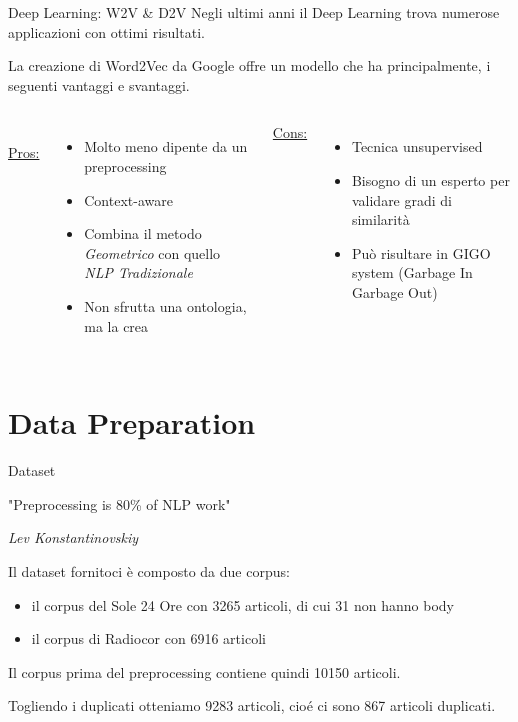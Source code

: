 \documentclass[british]{beamer}
\begin{document}
\begin{frame}{Deep Learning: W2V \& D2V}
	Negli ultimi anni il Deep Learning trova numerose applicazioni con ottimi risultati.\par
	La creazione di Word2Vec da Google offre un modello che ha principalmente, i seguenti vantaggi e svantaggi.
	\begin{columns}
		\\
		\underline{Pros:}
		\begin{itemize}
			\item Molto meno dipente da un preprocessing
			\item Context-aware
			\item Combina il metodo \textit{Geometrico} con quello \textit{NLP Tradizionale}
			\item Non sfrutta una ontologia, ma la \alert{crea} 
		\end{itemize}
		\underline{Cons:}
		\begin{itemize}
			\item Tecnica unsupervised 
			\item Bisogno di un esperto per validare gradi di similarità
			\item Pu\`{o} risultare in GIGO system (Garbage In Garbage Out)
		\end{itemize}
	\end{columns}
\end{frame}
	
\section{Data Preparation}

\begin{frame}{Dataset}
	\begin{displayquote}
		"Preprocessing is 80\% of NLP work"
		 
		\begin{flushright}
			\textit{Lev Konstantinovskiy}
		\end{flushright}
	\end{displayquote}
	Il dataset fornitoci \`{e} composto da due corpus: 
	\begin{itemize}
		\item il corpus del Sole 24 Ore con 3265 articoli, di cui 31 non hanno body
		\item il corpus di Radiocor con 6916 articoli
	\end{itemize}
	Il corpus prima del preprocessing contiene quindi 10150 articoli. \par
	Togliendo i duplicati otteniamo 9283 articoli, cio\'{e} ci sono 867 articoli duplicati.
\end{frame}
\end{document}
